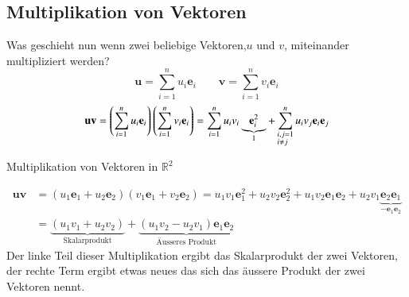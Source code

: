 \subsection{Multiplikation von Vektoren}
Was geschieht nun wenn zwei beliebige Vektoren,$u$ und $v$, miteinander multipliziert werden?
\begin{equation}
    \textbf{u} = 
    \sum_{i=1}^{n} u_i \textbf{e}_i 
    \qquad 
    \textbf{v} = \sum_{i=1}^{n} v_i \textbf{e}_i
\end{equation}
\begin{equation}
    \begin{split}
        \textbf{u}\textbf{v} 
        =
        \left ( 
        \sum_{i=1}^{n} u_i \textbf{e}_i
        \right ) 
        \left ( 
        \sum_{i=1}^{n} v_i \textbf{e}_i
        \right) 
        = 
        \sum_{i=1}^n u_iv_i\underbrace{\textbf{e}_i^2}_{1} 
        + \sum_{\begin{subarray}{l}i,j=1\\i \neq j\end{subarray}}^n  u_iv_j\textbf{e}_i\textbf{e}_j 
    \end{split}
\end{equation}
\begin{beispiel}
    Multiplikation von Vektoren in $\mathbb{R}^2$
\end{beispiel}
\begin{equation}
    \begin{split}
        \textbf{u}\textbf{v} 
        &= 
        (u_1\textbf{e}_1 + u_2\textbf{e}_2)(v_1\textbf{e}_1 + v_2\textbf{e}_2) 
        = 
        u_1v_1\textbf{e}_1^2
        + 
        u_2v_2\textbf{e}_2^2 
        + 
        u_1v_2\textbf{e}_1\textbf{e}_2 
        +  
        u_2v_1\underbrace{\textbf{e}_2\textbf{e}_1}_{-\textbf{e}_1\textbf{e}_2}
        \\\ 
        &=  
        \underbrace{(u_1v_1 + u_2v_2)}_{\text{Skalarprodukt}} 
        + 
        \underbrace{(u_1v_2 - u_2v_1)\textbf{e}_1\textbf{e}_2}_{\text{Äusseres Produkt}}
    \end{split}
\end{equation}
Der linke Teil dieser Multiplikation ergibt das Skalarprodukt der zwei Vektoren, der rechte Term ergibt etwas neues das sich das äussere Produkt der zwei Vektoren nennt.

